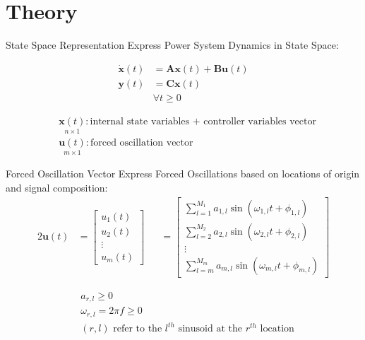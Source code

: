 \section[Theory]{Theory}
\label{sec:lasso_theory}

\begin{frame}[fragile]{State Space Representation}
	Express Power System Dynamics in State Space:

	\begin{align}
		\dot{\textbf{x}}(t) &= 
		\textbf{A}\textbf{x}(t)
		+ \textbf{B}\textbf{u}(t)\\
		\textbf{y}(t) &= 
		\textbf{C}\textbf{x}(t)\\  
		& \forall t\geq0	
	\end{align}
	
	\begin{align*}
		& \underset{\scriptscriptstyle n\times 1}{\textbf{x}(t)} : \text{internal state variables + controller variables vector}                                                                      \\
		& \underset{\scriptscriptstyle m\times 1}{\textbf{u}(t)} : \text{forced oscillation vector}
	\end{align*}
\end{frame}

\begin{frame}[fragile]{Forced Oscillation Vector}
	Express Forced Oscillations based on locations of origin and signal composition:
	\begin{alignat}{2}
		\textbf{u}(t) 
		&= 
		\begin{bmatrix}
			u_1(t) \\
			u_2(t) \\
			\vdots \\
			u_m(t)
		\end{bmatrix} 
		& &=
		\begin{bmatrix}
			\sum_{l=1}^{M_1} a_{1,l} \sin(\omega_{1,l}t + \phi_{1,l}) \\
			\sum_{l=2}^{M_2} a_{2,l} \sin(\omega_{2,l}t + \phi_{2,l}) \\
			\vdots \\
			\sum_{l=m}^{M_m} a_{m,l} \sin(\omega_{m,l}t + \phi_{m,l})
		\end{bmatrix} 
	\end{alignat}
	
	\begin{align*}
		& a_{r,l} \geq0 \\
		& \omega_{r,l} = 2\pi f \geq 0 \\
		& (r,l) \text{ refer to the } l^{th} \text{ sinusoid at the }  r^{th} \text{ location}
	\end{align*}

\end{frame}